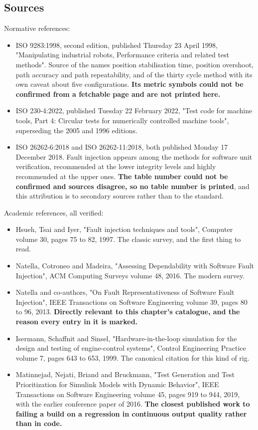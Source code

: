 \subsection*{Sources}

Normative references:
\begin{itemize}
\item ISO 9283:1998, second edition, published Thursday 23 April 1998,
"Manipulating industrial robots, Performance criteria and related test methods".
Source of the names position stabilisation time, position overshoot, path
accuracy and path repeatability, and of the thirty cycle method with its own
caveat about five configurations. \textbf{Its metric symbols could not be
confirmed from a fetchable page and are not printed here.}
\item ISO 230-4:2022, published Tuesday 22 February 2022, "Test code for machine
tools, Part 4: Circular tests for numerically controlled machine tools",
superseding the 2005 and 1996 editions.
\item ISO 26262-6:2018 and ISO 26262-11:2018, both published Monday 17 December
2018. Fault injection appears among the methods for software unit verification,
recommended at the lower integrity levels and highly recommended at the upper
ones. \textbf{The table number could not be confirmed and sources disagree, so no
table number is printed}, and this attribution is to secondary sources rather
than to the standard.
\end{itemize}

Academic references, all verified:
\begin{itemize}
\item Hsueh, Tsai and Iyer, "Fault injection techniques and tools", Computer
volume 30, pages 75 to 82, 1997. The classic survey, and the first thing to read.
\item Natella, Cotroneo and Madeira, "Assessing Dependability with Software Fault
Injection", ACM Computing Surveys volume 48, 2016. The modern survey.
\item Natella and co-authors, "On Fault Representativeness of Software Fault
Injection", IEEE Transactions on Software Engineering volume 39, pages 80 to 96,
2013. \textbf{Directly relevant to this chapter's catalogue, and the reason every
entry in it is marked.}
\item Isermann, Schaffnit and Sinsel, "Hardware-in-the-loop simulation for the
design and testing of engine-control systems", Control Engineering Practice
volume 7, pages 643 to 653, 1999. The canonical citation for this kind of rig.
\item Matinnejad, Nejati, Briand and Bruckmann, "Test Generation and Test
Prioritization for Simulink Models with Dynamic Behavior", IEEE Transactions on
Software Engineering volume 45, pages 919 to 944, 2019, with the earlier
conference paper of 2016. \textbf{The closest published work to failing a build on
a regression in continuous output quality rather than in code.}
\end{itemize}

